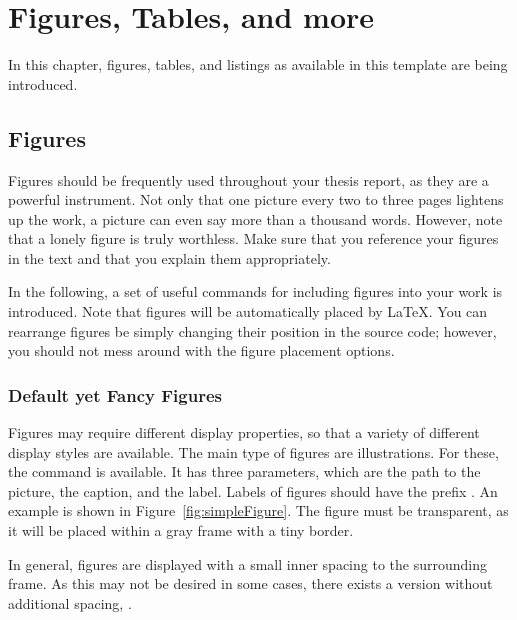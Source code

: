 \chapter{Figures, Tables, and more}

In this chapter, figures, tables, and listings as available in this template are being introduced.\cite{NS2Manual}


\section{Figures}\label{sec:figures}

Figures should be frequently used throughout your thesis report, as they are a powerful instrument. Not only that one picture every two to three pages lightens up the work, a picture can even say more than a thousand words. However, note that a lonely figure is truly worthless. Make sure that you reference your figures in the text and that you explain them appropriately.

In the following, a set of useful commands for including figures into your work is introduced. Note that figures will be automatically placed by \LaTeX. You can rearrange figures be simply changing their position in the source code; however, you should not mess around with the figure placement options.


\subsection{Default yet Fancy Figures}\label{sub:simpleFigures}

Figures may require different display properties, so that a variety of different display styles are available. The main type of figures are illustrations. For these, the  command is available. It has three parameters, which are the path to the picture, the caption, and the label. Labels of figures should have the prefix . An example is shown in Figure~\ref{fig:simpleFigure}. The figure must be transparent, as it will be placed within a gray frame with a tiny border.


In general, figures are displayed with a small inner spacing to the surrounding frame. As this may not be desired in some cases, there exists a version without additional spacing, .


